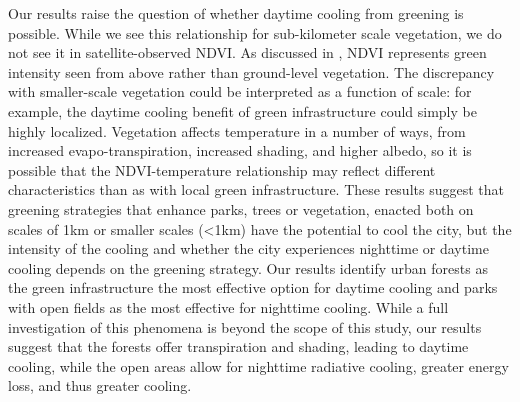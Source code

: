 \documentclass[draft,linenumbers]{agujournal}
\begin{document}
Our results raise the question of whether daytime cooling from greening is possible. While we see this relationship for sub-kilometer scale vegetation, we do not see it in satellite-observed NDVI. 
As discussed in \cite{scott2017temperature}, NDVI represents green intensity seen from above rather than ground-level vegetation. 
The discrepancy with smaller-scale vegetation could be interpreted as a function of scale: for example, the daytime cooling benefit of green infrastructure could simply be highly localized. 
Vegetation affects temperature in a number of ways, from increased evapo-transpiration, increased shading, and higher albedo, so it is possible that the NDVI-temperature relationship may reflect different characteristics than as with local green infrastructure. 
These results suggest that greening strategies that enhance parks, trees or vegetation, enacted both on scales of 1km or smaller scales (<1km) have the potential to cool the city, but the intensity of the cooling and whether the city experiences nighttime or daytime cooling depends on the greening strategy. Our results identify urban forests as the green infrastructure the most effective option for daytime cooling and parks with open fields as the most effective for nighttime cooling. 
While a full investigation of this phenomena is beyond the scope of this study, our results suggest that the forests offer transpiration and shading, leading to daytime cooling, while the open areas allow for nighttime radiative cooling, greater energy loss, and thus greater cooling. 
\end{document}
